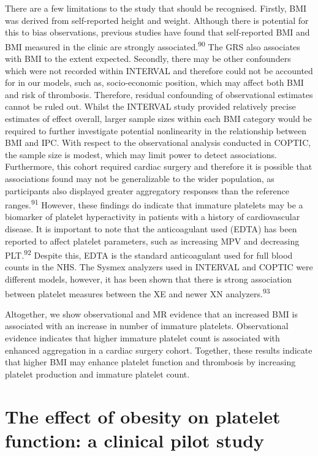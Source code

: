 \documentclass[11pt,twoside]{bristolthesis}
\begin{document}
There are a few limitations to the study that should be recognised. Firstly, BMI was derived from self-reported height and weight. Although there is potential for this to bias observations, previous studies have found that self-reported BMI and BMI measured in the clinic are strongly associated.\textsuperscript{90} The GRS also associates with BMI to the extent expected. Secondly, there may be other confounders which were not recorded within INTERVAL and therefore could not be accounted for in our models, such as, socio-economic position, which may affect both BMI and risk of thrombosis. Therefore, residual confounding of observational estimates cannot be ruled out. Whilst the INTERVAL study provided relatively precise estimates of effect overall, larger sample sizes within each BMI category would be required to further investigate potential nonlinearity in the relationship between BMI and IPC. With respect to the observational analysis conducted in COPTIC, the sample size is modest, which may limit power to detect associations. Furthermore, this cohort required cardiac surgery and therefore it is possible that associations found may not be generalizable to the wider population, as participants also displayed greater aggregatory responses than the reference ranges.\textsuperscript{91} However, these findings do indicate that immature platelets may be a biomarker of platelet hyperactivity in patients with a history of cardiovascular disease. It is important to note that the anticoagulant used (EDTA) has been reported to affect platelet parameters, such as increasing MPV and decreasing PLT.\textsuperscript{92} Despite this, EDTA is the standard anticoagulant used for full blood counts in the NHS. The Sysmex analyzers used in INTERVAL and COPTIC were different models, however, it has been shown that there is strong association between platelet measures between the XE and newer XN analyzers.\textsuperscript{93}

Altogether, we show observational and MR evidence that an increased BMI is associated with an increase in number of immature platelets. Observational evidence indicates that higher immature platelet count is associated with enhanced aggregation in a cardiac surgery cohort. Together, these results indicate that higher BMI may enhance platelet function and thrombosis by increasing platelet production and immature platelet count.

\hypertarget{BMI-platelets-clinic}{%
\chapter{The effect of obesity on platelet function: a clinical pilot study}\label{BMI-platelets-clinic}}
\end{document}
